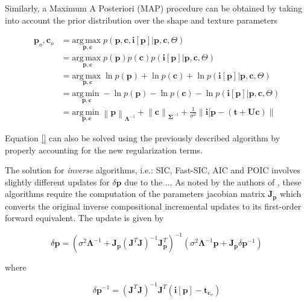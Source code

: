 Similarly, a Maximum A Posteriori (MAP) procedure can be obtained by taking into account the prior distribution over the shape and texture parameters

\begin{align}
\mathbf{p}_o, \mathbf{c}_o & = \underset{\mathbf{p}, \mathbf{c}}{\mathrm{arg\,max\;}} 
p(\mathbf{p}, \mathbf{c}, \mathbf{i}[\mathbf{p}] | \mathbf{p}, \mathbf{c}, \Theta)
\\
& = \underset{\mathbf{p}, \mathbf{c}}{\mathrm{arg\,max\;}} 
p(\mathbf{p}) p(\mathbf{c}) p(\mathbf{i}[\mathbf{p}] | \mathbf{p}, \mathbf{c}, \Theta)
\\
& = \underset{\mathbf{p}, \mathbf{c}}{\mathrm{arg\,max\;}} 
\ln p(\mathbf{p}) + \ln p(\mathbf{c}) + \ln p(\mathbf{i}[\mathbf{p}] | \mathbf{p}, \mathbf{c}, \Theta)
\\
& = \underset{\mathbf{p}, \mathbf{c}}{\mathrm{arg\,min\;}} 
- \ln p(\mathbf{p}) - \ln p(\mathbf{c}) - \ln p(\mathbf{i}[\mathbf{p}] | \mathbf{p}, \mathbf{c}, \Theta)
\\
& = \underset{\mathbf{p}, \mathbf{c}}{\mathrm{arg\,min\;}} 
\left\| \mathbf{p} \right\|_{\boldsymbol{\Lambda}^{-1}} + \left\| \mathbf{c} \right\|_{\boldsymbol{\Sigma}^{-1}} + 
\frac{1}{\sigma^2} \left\| \mathbf{i}[\mathbf{p} - \left( \mathbf{t} + \mathbf{U}\mathbf{c} \right) \right\|
\end{align}

Equation \ref{} can also be solved using the previously described algorithm by properly accounting for the new regularization terms.

The solution for \emph{inverse} algorithms, i.e.: SIC, Fast-SIC, AIC and POIC involves slightly different updates for $\delta \mathbf{p}$ due to the ... As noted by the authors of \cite{}, these algorithms require the computation of the parameters jacobian matrix $\mathbf{J}_{\mathbf{p}}$ which converts the original inverse compositional incremental updates to its first-order forward equivalent. The update is given by

\begin{equation}
\delta \mathbf{p} = 
\left( \sigma^2 \boldsymbol{\Lambda}^{-1} + \mathbf{J}_{\mathbf{p}} \left( \mathbf{J}^T\mathbf{J} \right)^{-1} \mathbf{J}_{\mathbf{p}}^T \right)^{-1} 
\left( \sigma^2 \boldsymbol{\Lambda}^{-1} \mathbf{p} + \mathbf{J}_{\mathbf{p}} \delta \mathbf{p}^{-1} \right)
\end{equation}

where

\begin{equation}
\delta \mathbf{p}^{-1} = 
\left( \mathbf{J}^T\mathbf{J} \right)^{-1} \mathbf{J}^T \left( \mathbf{i}[\mathbf{p}] - \mathbf{t}_{\mathbf{c}_o} \right)
\end{equation}

